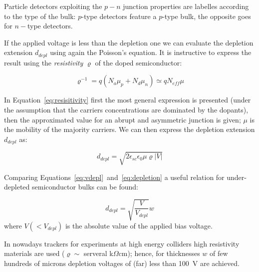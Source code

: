 Particle detectors exploiting the $p-n$ junction properties are labelles according to the type 
of the bulk: $p$-type detectors feature a $p$-type bulk, the opposite goes for $n-$type detectors.

If the applied voltage is less than the depletion one we can evaluate the depletion extension 
$d_{depl}$
using again the Poisson's equation. It is instructive to express the result using the {\it resistivity} 
$\varrho$ of the doped semiconductor:

\begin{equation}
\varrho^{-1}=q(N_a\mu_p+N_d\mu_n)\simeq qN_{eff}\mu
\label{eq:resisitivity}
\end{equation}

In Equation~\ref{eq:resisitivity} first the most general expression is presented (under the assumption 
that the carriers concentrations are dominated by the dopants), then the approximated value for an 
abrupt and asymmetric junction is given; $\mu$ is the mobility of the majority carriers.
We can then express the depletion extension $d_{depl}$ as:

\begin{equation}
d_{depl} = \sqrt{2\epsilon_{sc}\epsilon_{0}\mu\varrho|V|}
\label{eq:depletion}
\end{equation}

Comparing Equations~\ref{eq:vdepl}~and~\ref{eq:depletion} a useful relation for under-depleted 
semiconductor bulks can be found:

\begin{equation}
d_{depl} = \sqrt{\dfrac{V}{V_{depl}}}w
\label{eq:dunderdepleted}
\end{equation}
where $V(<V_{depl})$ is the absolute value of the applied bias voltage.

In nowadays trackers for experiments at high energy colliders
 high resistivity materials are used ($\varrho\sim$
 serveral k$\Omega$cm); hence, for thicknesses $w$ of few hundreds of microns depletion voltages of 
 (far) less than 100~V are achieved.


